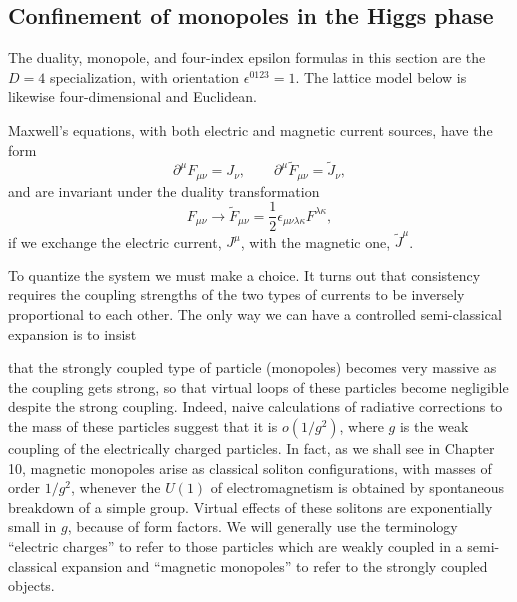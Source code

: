 \subsection{Confinement of monopoles in the Higgs phase}

The duality, monopole, and four-index epsilon formulas in this section are the
$D=4$ specialization, with orientation $\epsilon^{0123}=1$. The lattice model
below is likewise four-dimensional and Euclidean.

Maxwell's equations, with both electric and magnetic current sources, have the
form
\begin{equation*}
  \partial^\mu F_{\mu\nu}=J_\nu,
  \qquad \partial^\mu\widetilde F_{\mu\nu}=\widetilde J_\nu,
\end{equation*}
and are invariant under the duality transformation
\begin{equation*}
  F_{\mu\nu}\longrightarrow\widetilde F_{\mu\nu}
  =\frac12\epsilon_{\mu\nu\lambda\kappa}F^{\lambda\kappa},
\end{equation*}
if we exchange the electric current, $J^\mu$, with the magnetic one,
$\widetilde J^\mu$.

To quantize the system we must make a choice. It turns out that consistency
requires the coupling strengths of the two types of currents to be inversely
proportional to each other. The only way we can have a controlled semi-classical
expansion is to insist

that the strongly coupled type of particle (monopoles) becomes very massive as
the coupling gets strong, so that virtual loops of these particles become
negligible despite the strong coupling. Indeed, naive calculations of radiative
corrections to the mass of these particles suggest that it is $o(1/g^2)$,
where $g$ is the weak coupling of the electrically charged particles. In fact,
as we shall see in Chapter 10, magnetic monopoles arise as classical soliton
configurations, with masses of order $1/g^2$, whenever the $U(1)$ of
electromagnetism is obtained by spontaneous breakdown of a simple group.
Virtual effects of these solitons are exponentially small in $g$, because of
form factors. We will generally use the terminology ``electric charges'' to
refer to those particles which are weakly coupled in a semi-classical expansion
and ``magnetic monopoles'' to refer to the strongly coupled objects.

